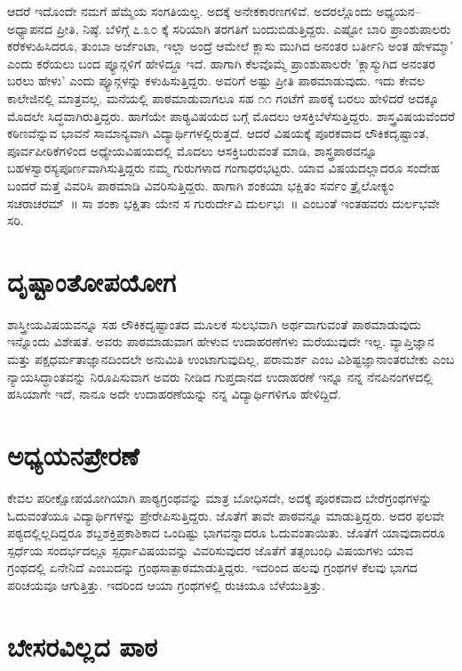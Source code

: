 {ಆದರೆ ಇದೊಂದೇ ನಮಗೆ ಹೆಮ್ಮೆಯ ಸಂಗತಿಯಲ್ಲ. ಅದಕ್ಕೆ ಅನೇಕಕಾರಣಗಳಿವೆ. ಅದರಲ್ಲೊಂದು ಅಧ್ಯಯನ–ಅಧ್ಯಾಪನದ ಪ್ರೀತಿ, ನಿಷ್ಠೆ. ಬೆಳಿಗ್ಗೆ ೭.೩೦ ಕ್ಕೆ ಸರಿಯಾಗಿ ತರಗತಿಗೆ ಬಂದುಬಿಡುತ್ತಿದ್ದರು. ಎಷ್ಟೋ ಬಾರಿ ಪ್ರಾಂಶುಪಾಲರು ಕರೆಕಳುಹಿಸಿದರೂ, ತುಂಬಾ ಅರ್ಜೆಂಟಾ, ಇಲ್ಲಾ ಅಂದ್ರೆ ಆಮೇಲೆ ಕ್ಲಾಸು ಮುಗಿದ ಅನಂತರ ಬರ್ತೀನಿ ಅಂತ ಹೇಳಮ್ಮಾ’ ಎಂದು ಕರೆಯಲು ಬಂದ ಪ್ಯೂನ್ಗಳಿಗೆ ಹೇಳಿದ್ದೂ ಇದೆ. ಹಾಗಾಗಿ ಕೆಲವೊಮ್ಮೆ ಪ್ರಾಂಶುಪಾಲರೇ ’ಕ್ಲಾಸ್ಮುಗಿದ ಅನಂತರ ಬರಲು ಹೇಳು’ ಎಂದು ಪ್ಯೂನ್ಗಳನ್ನು ಕಳುಹಿಸುತ್ತಿದ್ದರು. ಅವರಿಗೆ ಅಷ್ಟು ಪ್ರೀತಿ ಪಾಠಮಾಡುವುದು. ಇದು ಕೇವಲ ಕಾಲೇಜಿನಲ್ಲಿ ಮಾತ್ರವಲ್ಲ. ಮನೆಯಲ್ಲಿ ಪಾಠಮಾಡುವಾಗಲೂ ಸಹ ೧೧ ಗಂಟೆಗೆ ಪಾಠಕ್ಕೆ ಬರಲು ಹೇಳಿದರೆ ಅದಕ್ಕೂ ಮೊದಲೇ ಸಿದ್ಧವಾಗಿರುತ್ತಿದ್ದರು.
ಹಾಗೆಯೇ ಪಾಠ್ಯವಿಷಯದ ಬಗ್ಗೆ ಮೊದಲು ಆಸಕ್ತಿಬೆಳೆಸುತ್ತಿದ್ದರು. ಶಾಸ್ತ್ರವಿಷಯವೆಂದರೆ ಕಠಿಣವೆನ್ನುವ ಭಾವನೆ ಸಾಮಾನ್ಯವಾಗಿ ವಿದ್ಯಾರ್ಥಿಗಳಲ್ಲಿರುತ್ತದೆ. ಆದರೆ ವಿಷಯಕ್ಕೆ ಪೂರಕವಾದ ಲೌಕಿಕದೃಷ್ಟಾಂತ, ಪೂರ್ವಪೀಠಿಕೆಗಳಿಂದ ಅಧ್ಯೇಯವಿಷಯದಲ್ಲಿ ಮೊದಲು ಆಸಕ್ತಿಬರುವಂತೆ ಮಾಡಿ, ಶಾಸ್ತ್ರಪಾಠವನ್ನೂ ಬಹಳಸ್ವಾರಸ್ಯಪೂರ್ಣವಾಗಿಸುತ್ತಿದ್ದರು ನಮ್ಮ ಗುರುಗಳಾದ ಗಂಗಾಧರಭಟ್ಟರು. ಯಾವ ವಿಷಯದಲ್ಲಾದರೂ ಸಂದೇಹ ಬಂದರೆ ಮತ್ತೆ ವಿವರಿಸಿ ಪಾಠಮಾಡಿ ವಿವರಿಸುತ್ತಿದ್ದರು. ಹಾಗಾಗಿ ಶಂಕಯಾ ಭಕ್ಷಿತಂ ಸರ್ವಂ ತ್ರೈಲೋಕ್ಯಂ ಸಚರಾಚರಮ್~॥ ಸಾ ಶಂಕಾ ಭಕ್ಷಿತಾ ಯೇನ ಸ ಗುರುರ್ದೇವಿ ದುರ್ಲಭಃ~॥ ಎಂಬಂತೆ ಇಂತಹವರು ದುರ್ಲಭವೇ ಸರಿ.

\section*{ದೃಷ್ಟಾಂತೋಪಯೋಗ}

ಶಾಸ್ತ್ರೀಯವಿಷಯವನ್ನೂ ಸಹ ಲೌಕಿಕದೃಷ್ಟಾಂತದ ಮೂಲಕ ಸುಲಭವಾಗಿ ಅರ್ಥವಾಗುವಂತೆ ಪಾಠಮಾಡುವುದು ಇನ್ನೊಂದು ವಿಶೇಷತೆ. ಅವರು ಪಾಠಮಾಡುವಾಗ ಹೇಳುವ ಉದಾಹರಣೆಗಳು ಮರೆಯುವುದೇ ಇಲ್ಲ. ವ್ಯಾಪ್ತಿಜ್ಞಾನ ಮತ್ತು ಪಕ್ಷಧರ್ಮತಾಜ್ಞಾನದಿಂದಲೇ ಅನುಮಿತಿ ಉಂಟಾಗುವುದಿಲ್ಲ, ಪರಾಮರ್ಶ ಎಂಬ ವಿಶಿಷ್ಟಜ್ಞಾನಾಂತರಬೇಕು ಎಂಬ ನ್ಯಾಯಸಿದ್ಧಾಂತವನ್ನು ನಿರೂಪಿಸುವಾಗ ಅವರು ನೀಡಿದ ಗುಪ್ತದಾನದ ಉದಾಹರಣೆ ಇನ್ನೂ ನನ್ನ ನೆನಪಿನಂಗಳದಲ್ಲಿ ಹಸಿಯಾಗೇ ಇದೆ, ನಾನೂ ಅದೇ ಉದಾಹರಣೆಯನ್ನು ನನ್ನ ವಿದ್ಯಾರ್ಥಿಗಳಿಗೂ ಹೇಳಿದ್ದಿದೆ.

\section*{ಅಧ್ಯಯನಪ್ರೇರಣೆ}

ಕೇವಲ ಪರೀಕ್ಷೋಪಯೋಗಿಯಾಗಿ ಪಾಠ್ಯಗ್ರಂಥವನ್ನು ಮಾತ್ರ ಬೋಧಿಸದೇ, ಅದಕ್ಕೆ ಪೂರಕವಾದ ಬೇರೆಗ್ರಂಥಗಳನ್ನು ಓದುವಂತೆಯೂ ವಿದ್ಯಾರ್ಥಿಗಳನ್ನು ಪ್ರೇರೇಪಿಸುತ್ತಿದ್ದರು. ಜೊತೆಗೆ ತಾವೇ ಪಾಠವನ್ನೂ ಮಾಡುತ್ತಿದ್ದರು. ಅದರ ಫಲವೇ ಪಠ್ಯದಲ್ಲಿಲ್ಲದಿದ್ದರೂ ಶಬ್ದಶಕ್ತಿಪ್ರಕಾಶಿಕಾದ ಒಂದಿಷ್ಟು ಭಾಗವನ್ನಾದರೂ ಓದುವಂತಾಯಿತು. ಜೊತೆಗೆ ಯಾವುದಾದರೂ ಸ್ಪರ್ಧೆಯ ಸಂದರ್ಭದಲ್ಲೂ ಸ್ಪರ್ಧಾವಿಷಯವನ್ನು ವಿವರಿಸುವುದರ ಜೊತೆಗೆ ತತ್ಸಂಬಂಧಿ ವಿಷಯಗಳು ಯಾವ ಗ್ರಂಥದಲ್ಲಿ ಏನೇನಿದೆ ಎಂಬುದನ್ನು ಗ್ರಂಥಸಾತ್ಪಾಠಮಾಡುತ್ತಿದ್ದರು. ಇದರಿಂದ ಹಲವು ಗ್ರಂಥಗಳ ಕೆಲವು ಭಾಗದ ಪರಿಚಯವೂ ಆಗುತ್ತಿತ್ತು. ಇದರಿಂದ ಆಯಾ ಗ್ರಂಥಗಳಲ್ಲಿ ರುಚಿಯೂ ಬೆಳೆಯುತ್ತಿತ್ತು.

\section*{ಬೇಸರವಿಲ್ಲದ ಪಾಠ}

}
